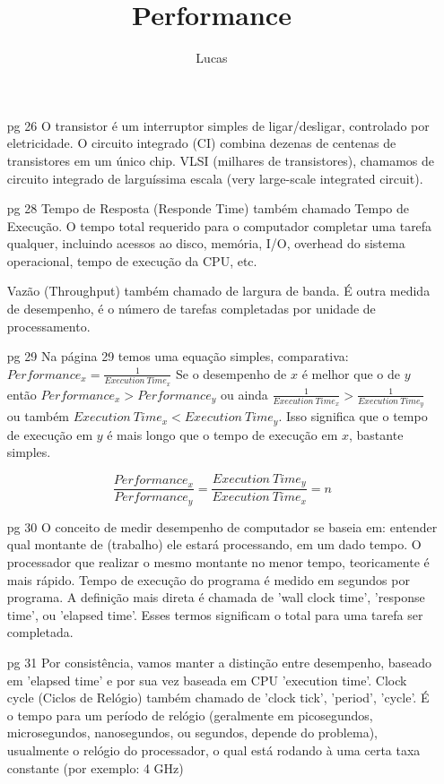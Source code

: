 \documentclass{article}
\author{Lucas}
\title{Performance}
\begin{document}
\maketitle

\begin{enumerate}

\item[pg 26] O transistor é um interruptor simples de ligar/desligar, controlado
por eletricidade. O circuito integrado (CI) combina dezenas de centenas de
transistores em um único chip. VLSI (milhares de transistores), chamamos de
circuito integrado de larguíssima escala (very large-scale integrated circuit).

\item[pg 28] Tempo de Resposta (Responde Time) também chamado Tempo de Execução.
O tempo total requerido para o computador completar uma tarefa qualquer,
incluindo acessos ao disco, memória, I/O, overhead do sistema operacional, tempo
de execução da CPU, etc.

Vazão (Throughput) também chamado de largura de banda. É outra medida de
desempenho, é o número de tarefas completadas por unidade de processamento.

\item[pg 29] Na página 29 temos uma equação simples, comparativa: 
$Performance_{x} = \frac{1}{Execution\ Time_{x}}$ Se o desempenho de $x$ é 
melhor que o de $y$ então $Performance_{x} > Performance_{y}$ ou ainda 
$\frac{1}{Execution\ Time_{x}} > \frac{1}{Execution\ Time_{y}}$ ou também 
$Execution\ Time_{x} < Execution\ Time_{y}$. Isso significa que o tempo de 
execução em $y$ é mais longo que o tempo de execução em $x$, bastante simples.

$$\frac{Performance_{x}}{Performance_{y}} = \frac{Execution\
Time_{y}}{Execution\ Time_{x}} = n$$

\item[pg 30] O conceito de medir desempenho de computador se baseia em:  
entender qual montante de (trabalho) ele estará processando, em um  dado tempo. 
O processador que realizar o mesmo montante no menor tempo, teoricamente é mais 
rápido. Tempo de execução do programa é medido em segundos por programa. A 
definição mais direta é chamada de 'wall clock time', 'response time', ou 
'elapsed time'. Esses termos significam o total para uma tarefa ser completada.

\item[pg 31] Por consistência, vamos manter a distinção entre desempenho, 
baseado em 'elapsed time' e por sua vez baseada em CPU 'execution time'. Clock 
cycle (Ciclos de Relógio) também chamado de 'clock tick', 'period', 'cycle'. É 
o tempo para um período de relógio (geralmente em picosegundos, microsegundos, 
nanosegundos, ou segundos, depende do problema), usualmente o relógio do 
processador, o qual está rodando à uma certa taxa constante (por exemplo: 4 GHz)


\end{enumerate}
\end{document}
